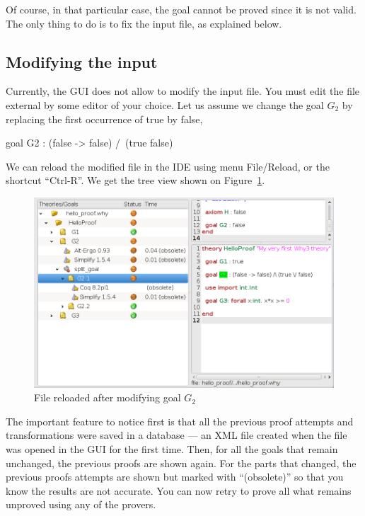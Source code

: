 Of course, in that particular case, the goal cannot be proved since it
is not valid. The only thing to do is to fix the input file, as
explained below.

\subsection{Modifying the input}

Currently, the GUI does not allow to modify the input file. You must
edit the file external by some editor of your choice. Let us assume we
change the goal $G_2$ by replacing the first occurrence of true by
false, \eg
\begin{whycode}
  goal G2 : (false -> false) /\ (true \/ false)
\end{whycode}
We can reload the modified file in the IDE using menu \textsf{File/Reload}, or the shortcut ``Ctrl-R''. We get the tree view shown on Figure~\ref{fig:gui5}.

\begin{figure}[tbp]
  \includegraphics[width=\textwidth]{gui-0-70-5.png}
  \caption{File reloaded after modifying goal $G_2$}
  \label{fig:gui5}
\end{figure}

The important feature to notice first is that all the previous proof
attempts and transformations were saved in a database --- an XML file
created when the \why file was opened in the GUI for the first
time. Then, for all the goals that remain unchanged, the previous
proofs are shown again. For the parts that changed, the previous
proofs attempts are shown but marked with ``(obsolete)''
so that you
know the results are not accurate. You can now retry to prove all what
remains unproved using any of the provers.

